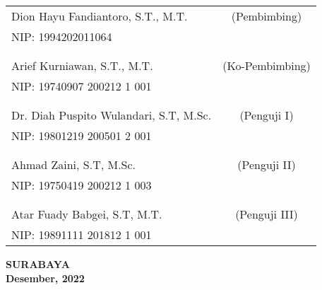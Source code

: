     \noindent
    \begin{tabularx}{\textwidth}{X c}
      Dion Hayu Fandiantoro, S.T., M.T.     & (Pembimbing) \\
      NIP: 1994202011064                    & \\
      &  \\
      &  \\
      Arief Kurniawan, S.T., M.T.           & (Ko-Pembimbing) \\
      NIP: 19740907 200212 1 001            & \\
      &  \\
      &  \\
      Dr. Diah Puspito Wulandari, S.T, M.Sc.                    & (Penguji I) \\
      NIP: 19801219 200501 2 001                                & \\
      &  \\
      &  \\
      Ahmad Zaini, S.T, M.Sc.                                   & (Penguji II) \\
      NIP: 19750419 200212 1 003                                & \\
      &  \\
      &  \\
      Atar Fuady Babgei, S.T, M.T.                              & (Penguji III) \\
      NIP: 19891111 201812 1 001                                & \\
    \end{tabularx} 
  \endgroup

  \vspace{4ex}

  \begin{center}
    \textbf{SURABAYA} \\
    \textbf{Desember, 2022}
  \end{center}
\endgroup

